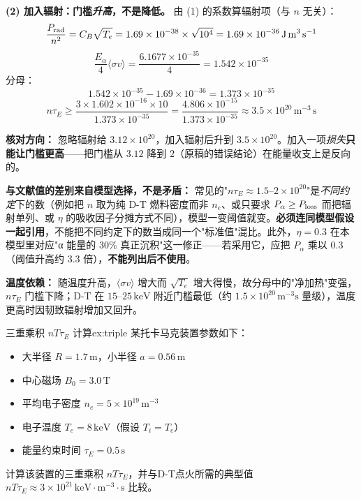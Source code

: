 \textbf{(2) 加入辐射：门槛\emph{升高}，不是降低。} 由 (1) 的系数算辐射项（与 $n$ 无关）：
\[
    \frac{P_{\rm rad}}{n^2} = C_B\sqrt{T_e} = 1.69\times10^{-38}\times\sqrt{10^4} = 1.69\times10^{-36}\,\mathrm{J\,m^3\,s^{-1}}
\]
\[
    \frac{E_\alpha}{4}\langle\sigma v\rangle = \frac{6.1677\times10^{-35}}{4} = 1.542\times10^{-35}
\]
分母：
\[
    1.542\times10^{-35} - 1.69\times10^{-36} = 1.373\times10^{-35}
\]
\[
    n\tau_E \ge \frac{3\times1.602\times10^{-16}\times10}{1.373\times10^{-35}}
    = \frac{4.806\times10^{-15}}{1.373\times10^{-35}} \approx \boxed{3.5\times10^{20}\,\mathrm{m^{-3}\,s}}
\]

\textbf{核对方向：} 忽略辐射给 $3.12\times10^{20}$，加入辐射后升到 $3.5\times10^{20}$。加入一项\emph{损失}\textbf{只能让门槛更高}——把门槛从 $3.12$ 降到 $2$（原稿的错误结论）在能量收支上是反向的。

\textbf{与文献值的差别来自模型选择，不是矛盾：} 常见的"$n\tau_E\approx1.5\text{--}2\times10^{20}$"是\emph{不同约定}下的数（例如把 $n$ 取为纯 D-T 燃料密度而非 $n_e$、或只要求 $P_\alpha\ge P_{\rm loss}$ 而把辐射单列、或 $\eta$ 的吸收因子分摊方式不同），模型一变阈值就变。\textbf{必须连同模型假设一起引用}，不能把不同约定下的数当成同一个"标准值"混比。此外，$\eta=0.3$ 在本模型里对应"α 能量的 30\% 真正沉积"这一修正——若采用它，应把 $P_\alpha$ 乘以 0.3（阈值升高约 3.3 倍），\textbf{不能列出后不使用}。

\textbf{温度依赖：} 随温度升高，$\langle\sigma v\rangle$ 增大而 $\sqrt{T_e}$ 增大得慢，故分母中的"净加热"变强，$n\tau_E$ 门槛下降；D-T 在 $15\text{--}25\,\mathrm{keV}$ 附近门槛最低（约 $1.5\times10^{20}\,\mathrm{m^{-3}s}$ 量级），温度更高时因韧致辐射增加又回升。


\begin{example}{三重乘积 $nT\tau_E$ 计算}{ex:triple}
某托卡马克装置参数如下：
\begin{itemize}
    \item 大半径 $R=1.7\,\mathrm{m}$，小半径 $a=0.56\,\mathrm{m}$
    \item 中心磁场 $B_0=3.0\,\mathrm{T}$
    \item 平均电子密度 $n_e=5\times10^{19}\,\mathrm{m^{-3}}$
    \item 电子温度 $T_e=8\,\mathrm{keV}$（假设 $T_i=T_e$）
    \item 能量约束时间 $\tau_E=0.5\,\mathrm{s}$
\end{itemize}
计算该装置的三重乘积 $nT\tau_E$，并与D-T点火所需的典型值 $nT\tau_E\approx 3\times10^{21}\,\mathrm{keV\cdot m^{-3}\cdot s}$ 比较。
\end{example}

